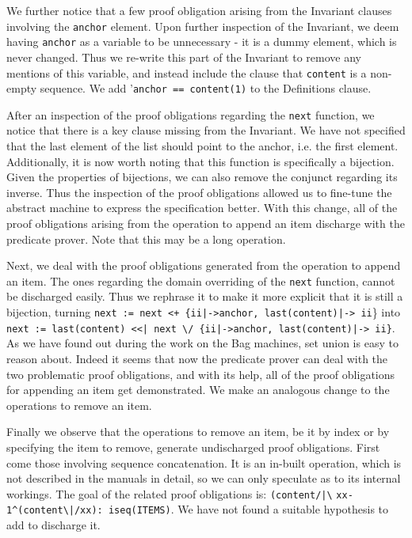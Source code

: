 \documentclass[12pt,journal,duplex]{IEEEtran}
\begin{document}
	We further notice that a few proof obligation arising from the Invariant clauses involving the \texttt{anchor} element. Upon further inspection of the Invariant, we deem having \texttt{anchor} as a variable to be unnecessary - it is a dummy element, which is never changed. Thus we re-write this part of the Invariant to remove any mentions of this variable, and instead include the clause that \texttt{content} is a non-empty sequence. We add '\texttt{anchor == content(1)} to the Definitions clause.

	After an inspection of the proof obligations regarding the \texttt{next} function, we notice that there is a key clause missing from the Invariant. We have not specified that the last element of the list should point to the anchor, i.e. the first element. Additionally, it is now worth noting that this function is specifically a bijection. Given the properties of bijections, we can also remove the conjunct regarding its inverse. Thus the inspection of the proof obligations allowed us to fine-tune the abstract machine to express the specification better. With this change, all of the proof obligations arising from the operation to append an item discharge with the predicate prover. Note that this may be a long operation.

	Next, we deal with the proof obligations generated from the operation to append an item. The ones regarding the domain overriding of the \texttt{next} function, cannot be discharged easily. Thus we rephrase it to make it more explicit that it is still a bijection, turning \texttt{next := next <+ \{ii|->anchor, last(content)|-> ii}\} into \texttt{next := {last(content)} <<| next }\verb|\|\texttt{/ \{ii|->anchor, last(content)|-> ii\}}. As we have found out during the work on the Bag machines, set union is easy to reason about. Indeed it seems that now the predicate prover can deal with the two problematic proof obligations, and with its help, all of the proof obligations for appending an item get demonstrated. We make an analogous change to the operations to remove an item.

	Finally we observe that the operations to remove an item, be it by index or by specifying the item to remove, generate undischarged proof obligations. First come those involving sequence concatenation. It is an in-built operation, which is not described in the manuals in detail, so we can only speculate as to its internal workings. The goal of the related proof obligations is:
	\texttt{(content/|}\verb|\| \texttt{xx-1}\verb|^|\texttt{(content}\verb|\|\texttt{|/xx): iseq(ITEMS)}. We have not found a suitable hypothesis to add to discharge it.
\end{document}

